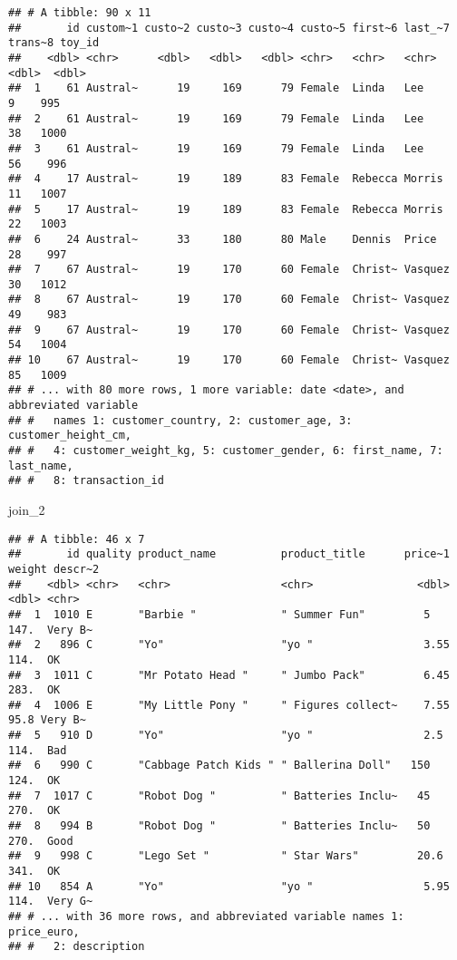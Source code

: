 \documentclass[
]{article}
\newenvironment{Shaded}{\begin{snugshade}}{\end{snugshade}}
\newcommand{\NormalTok}[1]{#1}
\begin{document}
\begin{verbatim}
## # A tibble: 90 x 11
##       id custom~1 custo~2 custo~3 custo~4 custo~5 first~6 last_~7 trans~8 toy_id
##    <dbl> <chr>      <dbl>   <dbl>   <dbl> <chr>   <chr>   <chr>     <dbl>  <dbl>
##  1    61 Austral~      19     169      79 Female  Linda   Lee           9    995
##  2    61 Austral~      19     169      79 Female  Linda   Lee          38   1000
##  3    61 Austral~      19     169      79 Female  Linda   Lee          56    996
##  4    17 Austral~      19     189      83 Female  Rebecca Morris       11   1007
##  5    17 Austral~      19     189      83 Female  Rebecca Morris       22   1003
##  6    24 Austral~      33     180      80 Male    Dennis  Price        28    997
##  7    67 Austral~      19     170      60 Female  Christ~ Vasquez      30   1012
##  8    67 Austral~      19     170      60 Female  Christ~ Vasquez      49    983
##  9    67 Austral~      19     170      60 Female  Christ~ Vasquez      54   1004
## 10    67 Austral~      19     170      60 Female  Christ~ Vasquez      85   1009
## # ... with 80 more rows, 1 more variable: date <date>, and abbreviated variable
## #   names 1: customer_country, 2: customer_age, 3: customer_height_cm,
## #   4: customer_weight_kg, 5: customer_gender, 6: first_name, 7: last_name,
## #   8: transaction_id
\end{verbatim}

\begin{Shaded}
\begin{Highlighting}[]
\NormalTok{join\_2}
\end{Highlighting}
\end{Shaded}

\begin{verbatim}
## # A tibble: 46 x 7
##       id quality product_name          product_title      price~1 weight descr~2
##    <dbl> <chr>   <chr>                 <chr>                <dbl>  <dbl> <chr>  
##  1  1010 E       "Barbie "             " Summer Fun"         5     147.  Very B~
##  2   896 C       "Yo"                  "yo "                 3.55  114.  OK     
##  3  1011 C       "Mr Potato Head "     " Jumbo Pack"         6.45  283.  OK     
##  4  1006 E       "My Little Pony "     " Figures collect~    7.55   95.8 Very B~
##  5   910 D       "Yo"                  "yo "                 2.5   114.  Bad    
##  6   990 C       "Cabbage Patch Kids " " Ballerina Doll"   150     124.  OK     
##  7  1017 C       "Robot Dog "          " Batteries Inclu~   45     270.  OK     
##  8   994 B       "Robot Dog "          " Batteries Inclu~   50     270.  Good   
##  9   998 C       "Lego Set "           " Star Wars"         20.6   341.  OK     
## 10   854 A       "Yo"                  "yo "                 5.95  114.  Very G~
## # ... with 36 more rows, and abbreviated variable names 1: price_euro,
## #   2: description
\end{verbatim}
\end{document}

